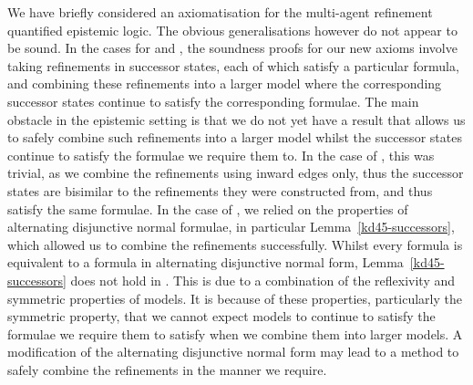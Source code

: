 We have briefly considered an axiomatisation for the multi-agent refinement
quantified epistemic logic. The obvious generalisations however do not appear to
be sound. In the cases for \classK{} and \classKD{}, the soundness proofs for
our new axioms involve taking refinements in successor states, each of which
satisfy a particular formula, and combining these refinements into a larger
model where the corresponding successor states continue to satisfy the
corresponding formulae. The main obstacle in the epistemic setting is that we do
not yet have a result that allows us to safely combine such refinements into a
larger model whilst the successor states continue to satisfy the formulae we
require them to.  In the case of \classK{}, this was trivial, as we combine the
refinements using inward edges only, thus the successor states are bisimilar to
the refinements they were constructed from, and thus satisfy the same formulae.
In the case of \classKD{}, we relied on the properties of alternating
disjunctive normal formulae, in particular Lemma~\ref{kd45-successors}, which
allowed us to combine the refinements successfully.  Whilst every \logicS{}
formula is equivalent to a formula in alternating disjunctive normal form,
Lemma~\ref{kd45-successors} does not hold in \logicS{}. This is due to a
combination of the reflexivity and symmetric properties of \classS{} models. It
is because of these properties, particularly the symmetric property, that we
cannot expect models to continue to satisfy the formulae we require them to
satisfy when we combine them into larger models. A modification of the
alternating disjunctive normal form may lead to a method to safely combine the
refinements in the manner we require.
